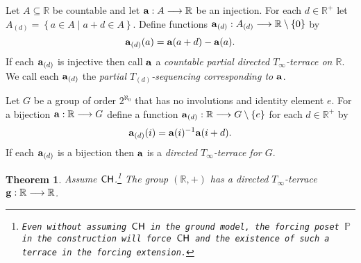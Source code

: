 \documentclass{amsart}
\newtheorem{theorem}{Theorem}
\theoremstyle{definition}
\theoremstyle{remark}
\renewcommand{\P}{\mathbb{P}}
\newcommand{\R}{\mathbb{R}}
\newcommand{\CH}{\textup{\textsf{CH}}}
\newcommand{\st}{\; | \;}
\newcommand{\set}[2]{\left\{#1\st #2 \right\}}
\newcommand{\To}{\longrightarrow}
\renewcommand{\a}{\textup{\textbf{a}}}
\newcommand{\g}{\textup{\textbf{g}}}
\begin{document}
Let $A \subseteq \R$ be countable and let $\a: A \To \R$ be an injection. For each $d \in \R^+$ let $A_{(d)} = \set{a \in A}{a+d \in A}$. Define functions $\a_{(d)}: A_{(d)} \To \R \setminus \{ 0 \}$ by $$\a_{(d)}(a) = \a(a+d)-\a(a).$$ If each $\a_{(d)}$ is injective then call $\a$ a \emph{countable partial directed $T_\infty$-terrace on $\R$}. We call each $\a_{(d)}$ the \emph{partial $T_{(d)}$-sequencing corresponding to $\a$}.

Let $G$ be a group of order $2^{\aleph_0}$ that has no involutions and identity element $e$. For a bijection $\a:\R \To G$ define a function $\a_{(d)}: \R \To G \setminus \{e\}$ for each $d \in \R^+$ by $$\a_{(d)}(i)=\a(i)^{-1}\a(i+d).$$ If each $\a_{(d)}$ is a bijection then $\a$ is a \emph{directed $T_\infty$-terrace for $G$}.

\begin{theorem}
Assume $\CH$.\footnote{\texttt{Even without assuming $\CH$ in the ground model, the forcing poset $\P$ in the construction will force $\CH$ and the existence of such a terrace in the forcing extension.}} The group $(\R, +)$ has a directed $T_\infty$-terrace $\g: \R \To \R$. 
\end{theorem}
\end{document}
